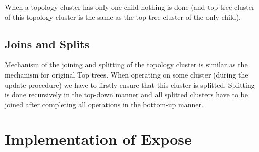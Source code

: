 When a topology cluster has only one child nothing is done (and top tree cluster
of this topology cluster is the same as the top tree cluster of the only child).

\subsection{Joins and Splits}

Mechanism of the joining and splitting of the topology cluster is similar as the
mechanism for original Top trees. When operating on some cluster (during the
update procedure) we have to firstly ensure that this cluster is splitted.
Splitting is done recursively in the top-down manner and all splitted clusters
have to be joined after completing all operations in the bottom-up manner.

\section{Implementation of Expose}

